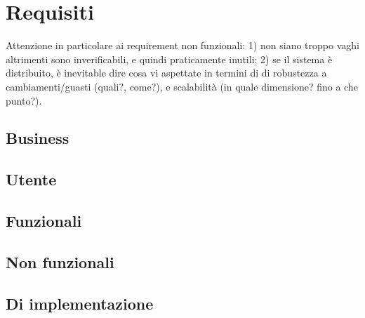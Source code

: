 \section{Requisiti}

Attenzione in particolare ai requirement non funzionali: 1) non siano troppo vaghi altrimenti sono inverificabili, e quindi praticamente inutili; 2) se il sistema è distribuito, è inevitable dire cosa vi aspettate in termini di di robustezza a cambiamenti/guasti (quali?, come?), e scalabilità (in quale dimensione? fino a che punto?).


\subsection{Business}
\subsection{Utente}
\subsection{Funzionali}
\subsection{Non funzionali}
\subsection{Di implementazione}
